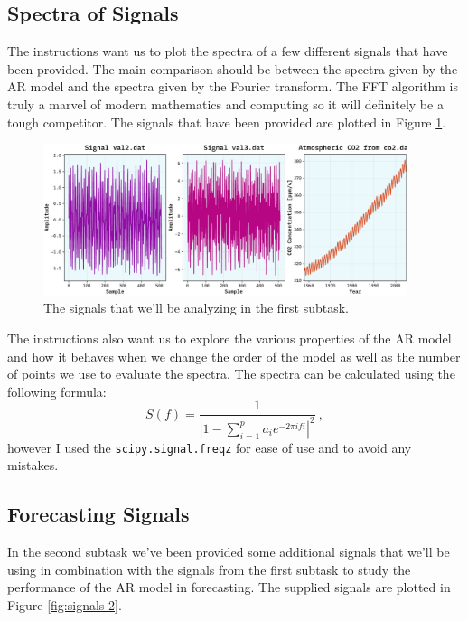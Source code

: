 \documentclass[10pt, titlepage, a4paper]{article}
\begin{document}
\subsection{Spectra of Signals}
The instructions want us to plot the spectra of a few different signals that have been provided. The main comparison 
should be between the spectra given by the AR model and the spectra given by the Fourier transform. The FFT algorithm 
is truly a marvel of modern mathematics and computing so it will definitely be a tough competitor. The signals that have 
been provided are plotted in Figure \ref{fig:signals}.

\begin{figure}[H]
    \centering
    \includegraphics[width=0.95\textwidth]{../MaxEntropy/Images/supplied-data.pdf}
    \caption{The signals that we'll be analyzing in the first subtask.}
    \label{fig:signals}
\end{figure}

The instructions also want us to explore the various properties of the AR model and how it behaves when we change the
order of the model as well as the number of points we use to evaluate the spectra. The spectra can be calculated 
using the following formula:
%
\begin{equation}
    S(f) = \frac{1}{|1 - \sum_{i=1}^p a_i e^{-2\pi i f i}|^2}\>,
\end{equation}
%
however I used the \texttt{scipy.signal.freqz} for ease of use and to avoid any mistakes. 

\subsection{Forecasting Signals}
In the second subtask we've been provided some additional signals that we'll be using in combination with the signals from 
the first subtask to study the performance of the AR model in forecasting. The supplied signals are plotted in Figure 
\ref{fig:signals-2}.
\end{document}
